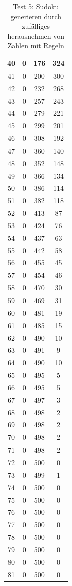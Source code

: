 \documentclass[11pt,a4paper]{article}
\begin{document}
\begin{table}[htbp!]
\begin{center}
\begin{tabular}{|*{4}{c|}}
 40 & 0 & 176 & 324 \\ \hline 
 41 & 0 & 200 & 300 \\ \hline 
 42 & 0 & 232 & 268 \\ \hline 
 43 & 0 & 257 & 243 \\ \hline 
 44 & 0 & 279 & 221 \\ \hline 
 45 & 0 & 299 & 201 \\ \hline 
 46 & 0 & 308 & 192 \\ \hline 
 47 & 0 & 360 & 140 \\ \hline 
 48 & 0 & 352 & 148 \\ \hline 
 49 & 0 & 366 & 134 \\ \hline 
 50 & 0 & 386 & 114 \\ \hline 
 51 & 0 & 382 & 118 \\ \hline 
 52 & 0 & 413 & 87 \\ \hline 
 53 & 0 & 424 & 76 \\ \hline 
 54 & 0 & 437 & 63 \\ \hline 
 55 & 0 & 442 & 58 \\ \hline 
 56 & 0 & 455 & 45 \\ \hline 
 57 & 0 & 454 & 46 \\ \hline 
 58 & 0 & 470 & 30 \\ \hline 
 59 & 0 & 469 & 31 \\ \hline 
 60 & 0 & 481 & 19 \\ \hline 
 61 & 0 & 485 & 15 \\ \hline 
 62 & 0 & 490 & 10 \\ \hline 
 63 & 0 & 491 & 9 \\ \hline 
 64 & 0 & 490 & 10 \\ \hline 
 65 & 0 & 495 & 5 \\ \hline 
 66 & 0 & 495 & 5 \\ \hline 
 67 & 0 & 497 & 3 \\ \hline 
 68 & 0 & 498 & 2 \\ \hline 
 69 & 0 & 498 & 2 \\ \hline 
 70 & 0 & 498 & 2 \\ \hline 
 71 & 0 & 498 & 2 \\ \hline 
 72 & 0 & 500 & 0 \\ \hline 
 73 & 0 & 499 & 1 \\ \hline 
 74 & 0 & 500 & 0 \\ \hline 
 75 & 0 & 500 & 0 \\ \hline 
 76 & 0 & 500 & 0 \\ \hline 
 77 & 0 & 500 & 0 \\ \hline 
 78 & 0 & 500 & 0 \\ \hline 
 79 & 0 & 500 & 0 \\ \hline 
 80 & 0 & 500 & 0 \\ \hline 
 81 & 0 & 500 & 0 \\ \hline 
 \end{tabular} 
 \end{center}
  \caption{Test 5: Sudoku generieren durch zufälliges herausnehmen von Zahlen mit Regeln}
\end{table} 
\end{document}
